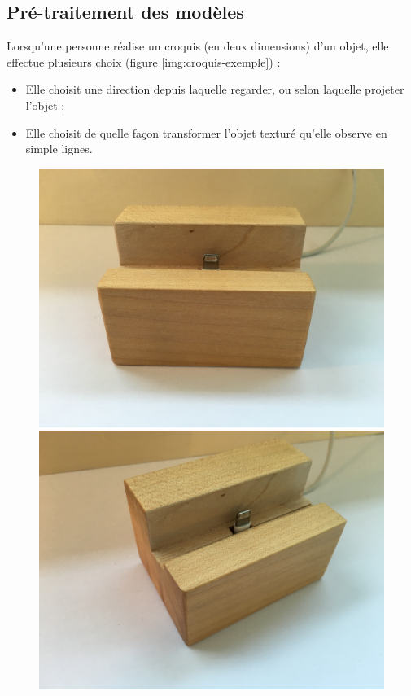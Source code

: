 \documentclass[12pt, a4paper, oneside]{article}
\begin{document}
\subsection{Pré-traitement des modèles}
\label{sub:Pré-traitement des modèles}

Lorsqu'une personne réalise un croquis (en deux dimensions) d'un objet, elle effectue plusieurs choix (figure \vref{img:croquis-exemple}) :
\begin{itemize}
    \item Elle choisit une direction depuis laquelle regarder, ou selon laquelle projeter l'objet ;
    \item Elle choisit de quelle façon transformer l'objet texturé qu'elle observe en simple lignes.
\end{itemize}

\begin{figure}
    \begin{center}
        \includegraphics[scale=0.038]{images/dock1.jpg}
        \includegraphics[scale=0.038]{images/dock2.jpg}

\end{center}
\end{figure}
\end{document}

